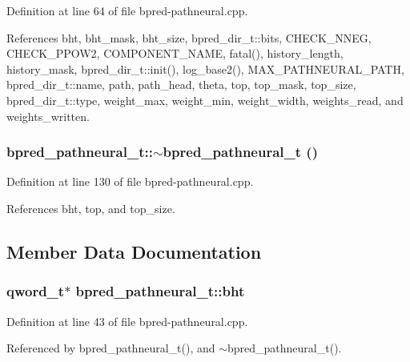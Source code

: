 Definition at line 64 of file bpred-pathneural.cpp.

References bht, bht\_\-mask, bht\_\-size, bpred\_\-dir\_\-t::bits, CHECK\_\-NNEG, CHECK\_\-PPOW2, COMPONENT\_\-NAME, fatal(), history\_\-length, history\_\-mask, bpred\_\-dir\_\-t::init(), log\_\-base2(), MAX\_\-PATHNEURAL\_\-PATH, bpred\_\-dir\_\-t::name, path, path\_\-head, theta, top, top\_\-mask, top\_\-size, bpred\_\-dir\_\-t::type, weight\_\-max, weight\_\-min, weight\_\-width, weights\_\-read, and weights\_\-written.
\subsubsection[{$\sim$bpred\_\-pathneural\_\-t}]{\setlength{\rightskip}{0pt plus 5cm}bpred\_\-pathneural\_\-t::$\sim$bpred\_\-pathneural\_\-t ()\hspace{0.3cm}{\tt  [inline]}}\label{classbpred__pathneural__t_04328c73312a390bd0ac479544b1412c}




Definition at line 130 of file bpred-pathneural.cpp.

References bht, top, and top\_\-size.

\subsection{Member Data Documentation}
\subsubsection[{bht}]{\setlength{\rightskip}{0pt plus 5cm}qword\_\-t$\ast$ {\bf bpred\_\-pathneural\_\-t::bht}\hspace{0.3cm}{\tt  [protected]}}\label{classbpred__pathneural__t_e80816a6f176f8e9472ebc0a3bd3f3aa}




Definition at line 43 of file bpred-pathneural.cpp.

Referenced by bpred\_\-pathneural\_\-t(), and $\sim$bpred\_\-pathneural\_\-t().

